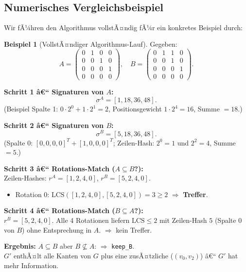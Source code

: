 ﻿\documentclass[12pt,a4paper,twoside]{article}
\theoremstyle{definition}
\newtheorem{beispiel}{Beispiel}[section]
\theoremstyle{plain}
\theoremstyle{remark}
\begin{document}
\subsection{Numerisches Vergleichsbeispiel}
\label{sub:sa_beispiel}

Wir fÃ¼hren den Algorithmus vollstÃ¤ndig fÃ¼r ein konkretes
Beispiel durch:

\begin{beispiel}[VollstÃ¤ndiger Algorithmus-Lauf]
Gegeben:
\[
  A = \begin{pmatrix}
    0 & 1 & 0 & 0 \\
    0 & 0 & 1 & 0 \\
    0 & 0 & 0 & 1 \\
    0 & 0 & 0 & 0
  \end{pmatrix}, \quad
  B = \begin{pmatrix}
    0 & 1 & 1 & 0 \\
    0 & 0 & 1 & 0 \\
    0 & 0 & 0 & 1 \\
    0 & 0 & 0 & 0
  \end{pmatrix}.
\]

\textbf{Schritt 1 â€“ Signaturen von $A$:}
\[
  \sigma^A = [1, 18, 36, 48].
\]
(Beispiel Spalte 1: $0 \cdot 2^0 + 1 \cdot 2^1 = 2$,
Positionsgewicht $1 \cdot 2^4 = 16$,
Summe $= 18$.)

\textbf{Schritt 2 â€“ Signaturen von $B$:}
\[
  \sigma^B = [5, 18, 36, 48].
\]
(Spalte 0: $[0,0,0,0]^T + [1,0,0,0]^T$;
Zeilen-Hash: $2^0 = 1$ und $2^2 = 4$, Summe $= 5$.)

\textbf{Schritt 3 â€“ Rotations-Match ($A \subseteq B$?):}\\
Zeilen-Hashes: $r^A = [1, 2, 4, 0]$,
$r^B = [5, 2, 4, 0]$.
\begin{itemize}
  \item Rotation 0: $\mathrm{LCS}([1,2,4,0], [5,2,4,0]) = 3 \geq 2$
        $\Rightarrow$ \textbf{Treffer}.
\end{itemize}

\textbf{Schritt 4 â€“ Rotations-Match ($B \subseteq A$?):}\\
$r^B = [5, 2, 4, 0]$.
Alle 4 Rotationen liefern $\mathrm{LCS} \leq 2$
mit Zeilen-Hash $5$ (Spalte 0 von $B$) ohne Entsprechung in $A$.
$\Rightarrow$ kein Treffer.

\textbf{Ergebnis:}
$A \subseteq B$ aber $B \not\subseteq A$:
$\Rightarrow$ \texttt{keep\_B}.  \\
$G'$ enthÃ¤lt alle Kanten von $G$ plus eine zusÃ¤tzliche
($(v_0, v_2)$) â€“ $G'$ hat mehr Information.
\end{beispiel}
\end{document}

